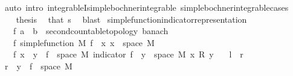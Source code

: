 \begin{isabellebody}
\ {\isacharparenleft}{\kern0pt}auto\ intro{\isacharcolon}{\kern0pt}\ integrableI{\isacharunderscore}{\kern0pt}simple{\isacharunderscore}{\kern0pt}bochner{\isacharunderscore}{\kern0pt}integrable\ simple{\isacharunderscore}{\kern0pt}bochner{\isacharunderscore}{\kern0pt}integrable{\isachardot}{\kern0pt}cases{\isacharparenright}{\kern0pt}\isanewline
\ \ \isacommand{{\isacharbraceright}{\kern0pt}}\isamarkupfalse%
\isanewline
\ \ \isamarkupfalse%
\ {\isacharquery}{\kern0pt}thesis\ \isamarkupfalse%
\ that\ s\ \isamarkupfalse%
\ blast\isanewline
{}\isamarkupfalse%
%
\endisatagproof
{\isafoldproof}%
%
\isadelimproof
\isanewline
%
\endisadelimproof
\isanewline
{}\isamarkupfalse%
\ simple{\isacharunderscore}{\kern0pt}function{\isacharunderscore}{\kern0pt}indicator{\isacharunderscore}{\kern0pt}representation{\isacharcolon}{\kern0pt}\isanewline
\ \ \ f\ {\isacharcolon}{\kern0pt}{\isacharcolon}{\kern0pt}{\isachardoublequoteopen}{\isacharprime}{\kern0pt}a\ {\isasymRightarrow}\ {\isacharprime}{\kern0pt}b\ {\isacharcolon}{\kern0pt}{\isacharcolon}{\kern0pt}\ {\isacharbraceleft}{\kern0pt}second{\isacharunderscore}{\kern0pt}countable{\isacharunderscore}{\kern0pt}topology{\isacharcomma}{\kern0pt}\ banach{\isacharbraceright}{\kern0pt}{\isachardoublequoteclose}\isanewline
\ \ \ f{\isacharcolon}{\kern0pt}\ {\isachardoublequoteopen}simple{\isacharunderscore}{\kern0pt}function\ M\ f{\isachardoublequoteclose}\ \ x{\isacharcolon}{\kern0pt}\ {\isachardoublequoteopen}x\ {\isasymin}\ space\ M{\isachardoublequoteclose}\isanewline
\ \ \ {\isachardoublequoteopen}f\ x\ {\isacharequal}{\kern0pt}\ {\isacharparenleft}{\kern0pt}{\isasymSum}y\ {\isasymin}\ f\ {\isacharbackquote}{\kern0pt}\ space\ M{\isachardot}{\kern0pt}\ indicator\ {\isacharparenleft}{\kern0pt}f\ {\isacharminus}{\kern0pt}{\isacharbackquote}{\kern0pt}\ {\isacharbraceleft}{\kern0pt}y{\isacharbraceright}{\kern0pt}\ {\isasyminter}\ space\ M{\isacharparenright}{\kern0pt}\ x\ {\isacharasterisk}{\kern0pt}\isactrlsub R\ y{\isacharparenright}{\kern0pt}{\isachardoublequoteclose}\isanewline
\ \ {\isacharparenleft}{\kern0pt}\ {\isachardoublequoteopen}{\isacharquery}{\kern0pt}l\ {\isacharequal}{\kern0pt}\ {\isacharquery}{\kern0pt}r{\isachardoublequoteclose}{\isacharparenright}{\kern0pt}\isanewline
%
\isadelimproof
%
\endisadelimproof
%
\isatagproof
{}\isamarkupfalse%
\ {\isacharminus}{\kern0pt}\isanewline
\ \ \isamarkupfalse%
\ {\isachardoublequoteopen}{\isacharquery}{\kern0pt}r\ {\isacharequal}{\kern0pt}\ {\isacharparenleft}{\kern0pt}{\isasymSum}y\ {\isasymin}\ f\ {\isacharbackquote}{\kern0pt}\ space\ M{\isachardot}{\kern0pt}\isanewline

\end{isabellebody}
